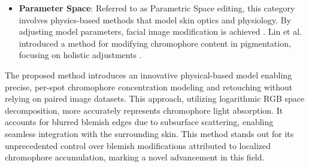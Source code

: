 \begin{spacing}{1.5}
\begin{itemize}
    \item \textbf{Parameter Space}: Referred to as Parametric Space editing, this category involves physics-based methods that model skin optics and physiology. By adjusting model parameters, facial image modification is achieved \cite{jungDeepLearningbasedOptical2023a, tsumuraImagebasedSkinColor}. Lin et al. introduced a method for modifying chromophore content in pigmentation, focusing on holistic adjustments \cite{linExemplarbasedFreckleRetouching2019}.

\end{itemize}

The proposed method introduces an innovative physical-based model enabling precise, per-spot chromophore concentration modeling and retouching without relying on paired image datasets. This approach, utilizing logarithmic RGB space decomposition, more accurately represents chromophore light absorption. It accounts for blurred blemish edges due to subsurface scattering, enabling seamless integration with the surrounding skin. This method stands out for its unprecedented control over blemish modifications attributed to localized chromophore accumulation, marking a novel advancement in this field.

\end{spacing}
\newpage
